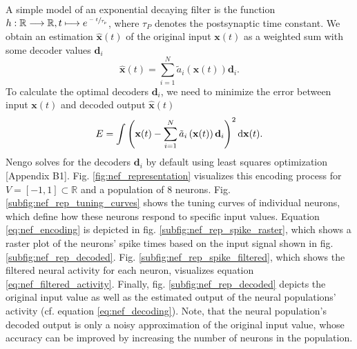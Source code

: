 A simple model of an exponential decaying filter is the function $h: \mathbb{R} \longrightarrow \mathbb{R}, t \longmapsto e^{\sfrac{-t}{\tau_{p}}}$, where $\tau_{P}$ denotes the postsynaptic time constant.
We obtain an estimation $\mathbf{\hat{x}}(t)$ of the original input $\mathbf{x}(t)$ as a weighted sum with some decoder values $\mathbf{d}_{i}$
\begin{equation}
\mathbf{\hat{x}}(t) = \sum_{i=1}^{N} \tilde{a}_{i}\left(\mathbf{x}(t)\right) \mathbf{d}_{i}.
\label{eq:nef_decoding} 
\end{equation} 
To calculate the optimal decoders $\mathbf{d}_{i}$, we need to minimize the error between input $\mathbf{x}(t)$ and decoded output $\mathbf{\hat{x}}(t)$
\begin{equation}
E = \int \left( \mathbf{x}(t) - \sum_{i=1}^{N} \tilde{a}_{i}\left(\mathbf{x}(t)\right) \mathbf{d}_{i}\right)^{2} \mathop{}\!\mathrm{d} \mathbf{x}(t).
\label{eq:decoder_calculation}
\end{equation}
\ac{Nengo} solves for the decoders $\mathbf{d}_{i}$ by default using least squares optimization \cite{Eliasmith2013}[Appendix B1].
Fig. \ref{fig:nef_representation} visualizes this encoding process for $V = \left[ -1, 1\right] \subset \mathbb{R}$ and a population of $8$ neurons.
Fig. \ref{subfig:nef_rep_tuning_curves} shows the tuning curves of individual neurons, which define how these neurons respond to specific input values.
Equation \ref{eq:nef_encoding} is depicted in fig. \ref{subfig:nef_rep_spike_raster}, which shows a raster plot of the neurons' spike times based on the input signal shown in fig. \ref{subfig:nef_rep_decoded}.
Fig. \ref{subfig:nef_rep_spike_filtered}, which shows the filtered neural activity for each neuron, visualizes equation \ref{eq:nef_filtered_activity}.
Finally, fig. \ref{subfig:nef_rep_decoded} depicts the original input value as well as the estimated output of the neural populations' activity (cf. equation \ref{eq:nef_decoding}).
Note, that the neural population's decoded output is only a noisy approximation of the original input value, whose accuracy can be improved by increasing the number of neurons in the population.

